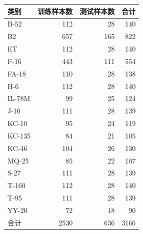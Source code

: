 \begin{tabular}{lrrr}
\toprule
类别 & 训练样本数 & 测试样本数 & 合计 \\
\midrule
B-52 & 112 & 28 & 140 \\
B2 & 657 & 165 & 822 \\
ET & 112 & 28 & 140 \\
F-16 & 443 & 111 & 554 \\
FA-18 & 110 & 28 & 138 \\
H-6 & 112 & 28 & 140 \\
IL-78M & 99 & 25 & 124 \\
J-10 & 111 & 28 & 139 \\
KC-10 & 95 & 24 & 119 \\
KC-135 & 84 & 21 & 105 \\
KC-46 & 104 & 26 & 130 \\
MQ-25 & 85 & 22 & 107 \\
S-27 & 111 & 28 & 139 \\
T-160 & 112 & 28 & 140 \\
T-95 & 111 & 28 & 139 \\
YY-20 & 72 & 18 & 90 \\
\midrule
合计 & 2530 & 636 & 3166 \\
\bottomrule
\end{tabular}
